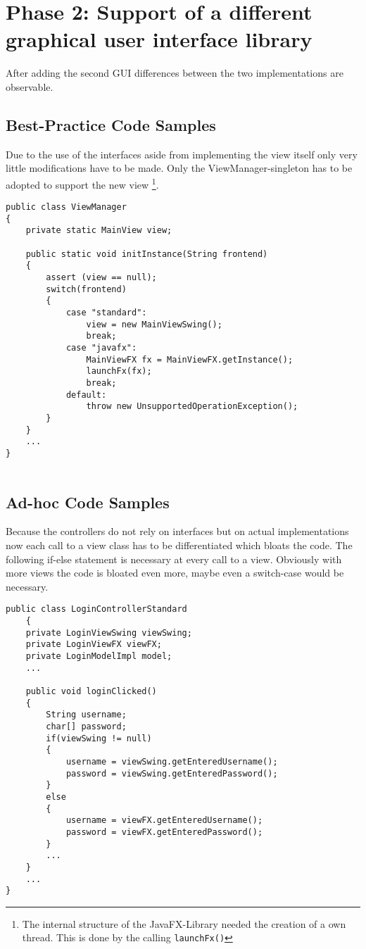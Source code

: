 \clearpage
\section{Phase 2: Support of a different graphical user interface library}
After adding the second GUI differences between the two implementations are observable.

\subsection{Best-Practice Code Samples}
Due to the use of the interfaces aside from implementing the view itself only very little modifications have to be made. Only the ViewManager-singleton has to be adopted to support the new view \footnote{The internal structure of the JavaFX-Library needed the creation of a own thread. This is done by the calling \texttt{launchFx()}}.

\begin{lstlisting}[caption={View Manager after implementation of a second GUI. Only a case branch has to be added.}, captionpos=b]
public class ViewManager
{
	private static MainView view;
	
	public static void initInstance(String frontend)
	{
		assert (view == null);
		switch(frontend)
		{
			case "standard":
				view = new MainViewSwing();
				break;
			case "javafx":
				MainViewFX fx = MainViewFX.getInstance();
				launchFx(fx);
				break;
			default:
				throw new UnsupportedOperationException();
		}
	}
	...
}
	
\end{lstlisting}

\subsection{Ad-hoc Code Samples}
\label{sec:ad-hoc-javafx}
Because the controllers do not rely on interfaces but on actual implementations now each call to a view class has to be differentiated which bloats the code. The following if-else statement is necessary at every call to a view. Obviously with more views the code is bloated even more, maybe even a switch-case would be necessary.

\begin{lstlisting}[caption={Code snipped showing login-code after implementing a second GUI. Because no interface but concrete implementations are used each time a view access is needed the program is required to check for which of the two GUIs is currently active. Controller methods of the best pratice version do not change in any way.}, captionpos=b, label={lst:controller-switch}]
	public class LoginControllerStandard
	{
	private LoginViewSwing viewSwing;
	private LoginViewFX viewFX;
	private LoginModelImpl model;
	...
	
	public void loginClicked()
	{
		String username;
		char[] password;
		if(viewSwing != null)
		{
			username = viewSwing.getEnteredUsername();
			password = viewSwing.getEnteredPassword();
		}
		else
		{
			username = viewFX.getEnteredUsername();
			password = viewFX.getEnteredPassword();
		}
		...
	}
	...
}
\end{lstlisting}


